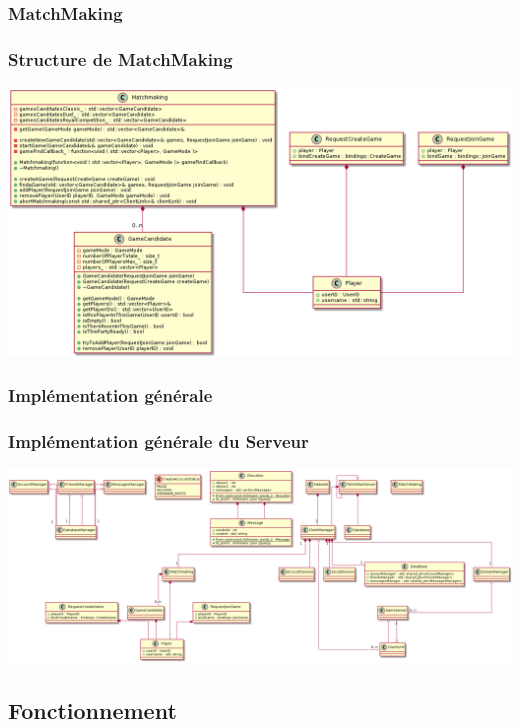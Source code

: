 \documentclass{beamer}
\begin{document}
\subsubsection{MatchMaking}
\begin{frame}
\frametitle{Structure de MatchMaking}

\includegraphics[width=1\textwidth]{../../res/uml/class/MatchMakingClass.png}
\end{frame}

\subsubsection{Implémentation générale}
\begin{frame}
\frametitle{Implémentation générale du Serveur}

\includegraphics[width=1\textwidth]{../../res/uml/class/ServerStructureClass.png}
\end{frame}

\subsection{Fonctionnement}
\end{document}

